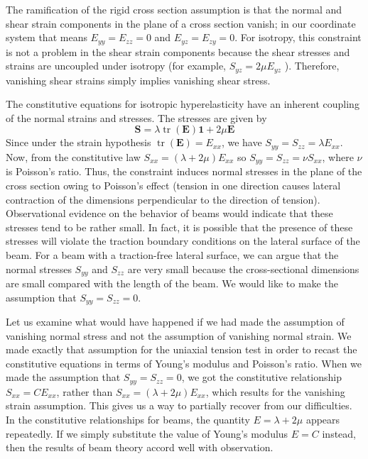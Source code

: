 \newcommand{\ThreeTensor}[1]{\mathsf{#1}}

The ramification of the rigid cross section assumption is that the normal and shear strain components in the plane of a cross section vanish; in our coordinate system that means
\(E_{yy}=E_{zz}=0\) and \(E_{yz}=E_{zy}=0\). 
For isotropy, this
constraint is not a problem in the shear strain components because the
shear stresses and strains are uncoupled under isotropy (for example,
\(S_{yz}=2 \mu E_{yz}\) ). Therefore, vanishing shear strains simply
implies vanishing shear stress.

The constitutive equations for isotropic hyperelasticity have an
inherent coupling of the normal strains and stresses. The stresses are
given by \[
\mathbf{S}=\lambda \operatorname{tr}(\bm{E}) \bm{1}+2 \mu \mathbf{E}
\] Since under the strain hypothesis
\(\operatorname{tr}(\bm{E})=E_{xx}\), we have
\(S_{yy}=S_{zz}=\lambda E_{xx}\). Now, from the constitutive law
\(S_{xx}=(\lambda+2 \mu) E_{xx}\) so \(S_{yy}=S_{zz}=\nu S_{xx}\), where
\(\nu\) is Poisson's ratio. Thus, the constraint induces normal stresses
in the plane of the cross section owing to Poisson's effect (tension in
one direction causes lateral contraction of the dimensions perpendicular
to the direction of tension). Observational evidence on the behavior of
beams would indicate that these stresses tend to be rather small. In
fact, it is possible that the presence of these stresses will violate
the traction boundary conditions on the lateral surface of the beam. For
a beam with a traction-free lateral surface, we can argue that the
normal stresses \(S_{yy}\) and \(S_{zz}\) are very small because the
cross-sectional dimensions are small compared with the length of the
beam. We would like to make the assumption that \(S_{yy}=S_{zz}=0\).

Let us examine what would have happened if we had made the assumption of
vanishing normal stress and not the assumption of vanishing normal
strain. We made exactly that assumption for the uniaxial tension test in
order to recast the constitutive equations in terms of Young's modulus
and Poisson's ratio. When we made the assumption that
\(S_{yy}=S_{zz}=0\), we got the constitutive relationship
\(S_{xx}=C E_{xx}\), rather than \(S_{xx}=(\lambda+2 \mu) E_{xx}\),
which results for the vanishing strain assumption. This gives us a way
to partially recover from our difficulties. In the constitutive
relationships for beams, the quantity \(E=\lambda+2 \mu\) appears
repeatedly. If we simply substitute the value of Young's modulus \(E=C\)
instead, then the results of beam theory accord well with observation.

